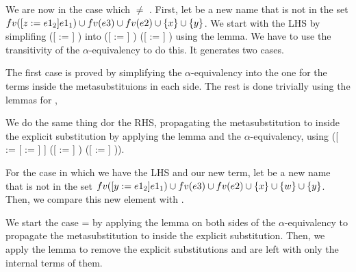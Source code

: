 \begin{coqdoccode}
\end{coqdoccode}
We are now in the case which  \ensuremath{\not=} . First, let  be a new name that is not in the set $fv(\esub{e1_1}{z}{e1_2}) \cup fv(e3) \cup fv(e2) \cup \{x\} \cup \{y\}$. We start with the LHS by simplifing ([ := ]    ) into  ([ := ]    )  ([ := ] ) using the  lemma. We have to use the transitivity of the $\alpha$-equivalency to do this. It generates two cases. 
\begin{coqdoccode}
\end{coqdoccode}
The first case is proved by simplifying the $\alpha$-equivalency into the one for the terms inside the metasubstituions in each side. The rest is done trivially using the lemmas for ,
\begin{coqdoccode}
\end{coqdoccode}
We do the same thing dor the RHS, propagating the metasubstitution to inside the explicit substitution by applying the  lemma and the $\alpha$-equivalency, using ([ := [ := ] ]  ([ := ]    )  ([ := ] )). 
\begin{coqdoccode}
\end{coqdoccode}
For the case in which we have the LHS and our new term, let  be a new name that is not in the set $fv(\esub{e1_1}{y}{e1_2}) \cup fv(e3) \cup fv(e2) \cup \{x\} \cup \{w\} \cup \{y\}$. Then, we compare this new element with . 
\begin{coqdoccode}
\end{coqdoccode}
We start the case  =  by applying the  lemma on both sides of the $\alpha$-equivalency to propagate the metasubstitution to inside the explicit substitution. Then, we apply the  lemma to remove the explicit substitutions and are left with only the internal terms of them.
\begin{coqdoccode}
\end{coqdoccode}
